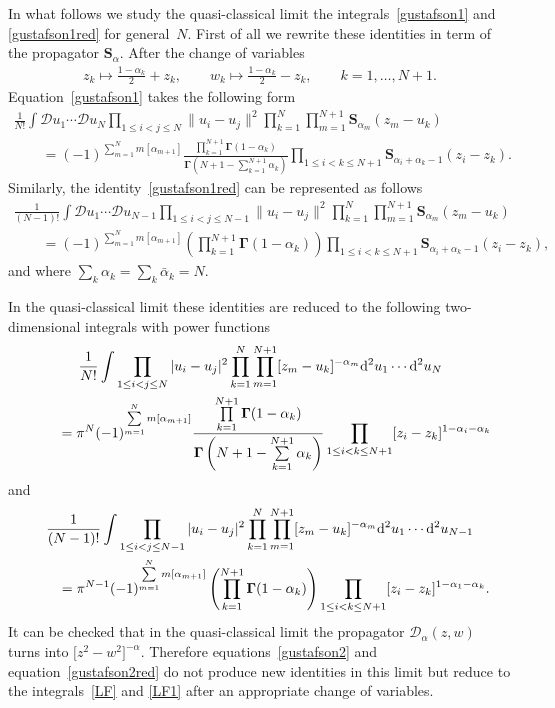 \documentclass[pdftex]{sigma}
\numberwithin{equation}{section}
\begin{document}
In what follows we study the quasi-classical limit the integrals~\eqref{gustafson1} and \eqref{gustafson1red} for general~$N$. First of all we rewrite these identities in term of the propagator $\boldsymbol S_\alpha$. After the change of variables
\begin{gather*}
z_k\mapsto\frac{1-\alpha_k}2+z_k, \qquad w_k\mapsto\frac{1-\alpha_k}2-z_k, \qquad k=1,\ldots,N+1.
\end{gather*}
Equation~\eqref{gustafson1} takes the following form
\begin{gather*}
 \frac 1{N!} \int \mathcal{D} u_1\cdots \mathcal Du_{N}
 \prod_{1\leq i<j \leq N} \|u_i-u_j\|^2
 \prod_{k=1}^N\prod_{m=1}^{N+1} \boldsymbol S_{\alpha_m}(z_m-u_k)
 \\ \qquad{} =(-1)^{\sum\limits_{m=1}^N m [\alpha_{m+1}]}\frac{\prod\limits_{k=1}^{N+1}
 \boldsymbol \Gamma(1-\alpha_k)}{\boldsymbol\Gamma\left(N+1-\sum\limits_{k=1}^{N+1}\alpha_k\right)}
\prod_{1\leq i<k \leq N+1} \boldsymbol S_{\alpha_i+\alpha_k-1}(z_{i}-z_k) .
\end{gather*}
Similarly, the identity~\eqref{gustafson1red} can be represented as follows
\begin{gather*}
 \frac 1{(N-1)!} \int \mathcal{D} u_1\cdots \mathcal Du_{N-1} \prod_{1\leq i<j \leq N-1} \|u_i-u_j\|^2
\prod_{k=1}^N\prod_{m=1}^{N+1} \boldsymbol S_{\alpha_m}(z_m-u_k)
 \\ \qquad{} =(-1)^{\sum\limits_{m=1}^N m [\alpha_{m+1}]}
 \left( \prod_{k=1}^{N+1}\boldsymbol \Gamma(1-\alpha_k) \right)
\prod_{1\leq i<k \leq N+1} \boldsymbol S_{\alpha_i+\alpha_k-1}(z_{i}-z_k) ,
\end{gather*}
and where $\sum_k \alpha_k=\sum_k \bar \alpha_k=N$.

In the quasi-classical limit these identities are reduced to the following two-dimensional integrals with power functions
\begin{gather}
 \frac 1{N!} \int\prod_{1\leq i<j \leq N} |u_i-u_j|^2\prod_{k=1}^N\prod_{m=1}^{N+1}
 [z_m-u_k]^{-\alpha_m} {\rm d}^2u_1\cdots {\rm d}^2u_N \nonumber\\
 \qquad {}=\pi^N (-1)^{\sum\limits_{m=1}^N m [\alpha_{m+1}]}\frac{\prod\limits_{k=1}^{N+1}
 \boldsymbol \Gamma(1-\alpha_k)}{\boldsymbol\Gamma
 \left(N+1-\sum\limits_{k=1}^{N+1}\alpha_k\right)} \prod_{1\leq i<k \leq N+1}
[z_{i}-z_k]^{1-\alpha_i-\alpha_k}\label{LF}
\end{gather}
and
\begin{gather}
 \frac 1{(N-1)!} \int\prod_{1\leq i<j \leq N-1} |u_i-u_j|^2
 \prod_{k=1}^N\prod_{m=1}^{N+1}
 [z_m-u_k]^{-\alpha_m} {\rm d}^2u_1\cdots {\rm d}^2u_{N-1}
\nonumber \\ \qquad{} =\pi^{N-1}(-1)^{\sum\limits_{m=1}^N m [\alpha_{m+1}]}
 \left( \prod_{k=1}^{N+1}\boldsymbol \Gamma(1-\alpha_k) \right)
\prod_{1\leq i<k \leq N+1}
[z_{i}-z_k]^{1-\alpha_1-\alpha_k}.\label{LF1}
\end{gather}
It can be checked that in the quasi-classical limit the propagator $\boldsymbol{\mathcal D}_\alpha(z,w)$ turns into $
\big[z^2-w^2\big]^{-\alpha}. $ Therefore equations~\eqref{gustafson2} and equation~\eqref{gustafson2red} do not produce new identities
in this limit but reduce to the integrals~\eqref{LF} and \eqref{LF1} after an appropriate change of variables.
\end{document}
